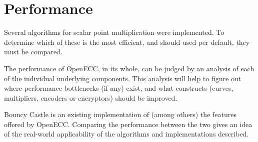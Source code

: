 \section{Performance}
\label{sec:performance}
 
Several algorithms for scalar point multiplication were implemented. To determine which of these is the most efficient,
and should used per default, they must be compared.
 
The performance of OpenECC, in its whole, can be judged by an analysis of each of the
individual underlying components. This analysis will help to figure out where performance bottlenecks (if
any) exist, and what constructs (curves, multipliers, encoders or encryptors) should be improved.
 
Bouncy Castle is an existing implementation of (among others) the features offered by OpenECC. Comparing the performance
between the two gives an idea of the real-world applicability of the algorithms and implementations described.



